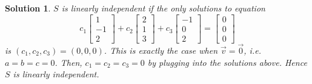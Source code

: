 \documentclass[]{book}
\newtheorem*{solution}{Solution}
\begin{document}
\begin{example}
\begin{solution}
    $S$ is linearly independent if the only solutions to equation
    \[c_1\begin{bmatrix}1 \\ -1 \\ 2\end{bmatrix} + c_2\begin{bmatrix}2\\ 1 \\ 3\end{bmatrix} + c_3\begin{bmatrix}-1 \\ 0 \\ 2\end{bmatrix} = \begin{bmatrix}0\\ 0 \\ 0\end{bmatrix}\] is $(c_1,c_2,c_3)=(0,0,0)$. This is exactly the case when $\vec{v}=\vec{0}$, i.e. $a=b=c=0$. Then, $c_1=c_2=c_3=0$ by plugging into the solutions above. Hence $S$ is linearly independent. \hfill\qedsymbol
\end{solution}
\end{example}
\end{document}
